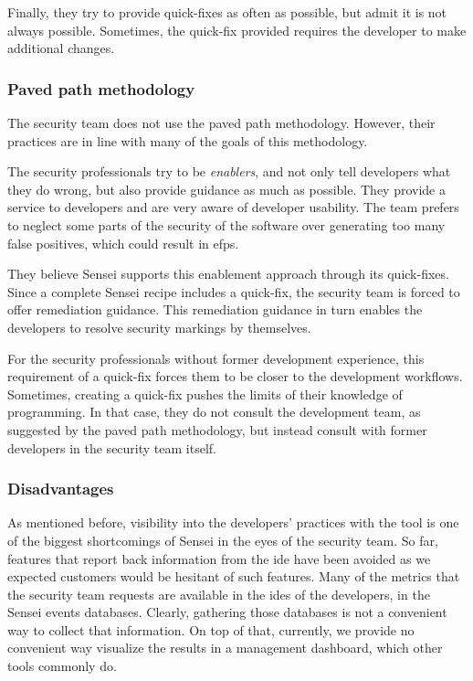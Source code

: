Finally, they try to provide quick-fixes as often as possible, but admit it is not always possible.
Sometimes, the quick-fix provided requires the developer to make additional changes.

\subsubsection{Paved path methodology}
The security team does not use the paved path methodology.
However, their practices are in line with many of the goals of this methodology.

The security professionals try to be \textit{enablers}, and not only tell developers what they do wrong, but also provide guidance as much as possible.
They provide a service to developers and are very aware of developer usability.
The team prefers to neglect some parts of the security of the software over generating too many false positives, which could result in \glspl{efp}.

They believe Sensei supports this enablement approach through its quick-fixes.
Since a complete Sensei recipe includes a quick-fix, the security team is forced to offer remediation guidance.
This remediation guidance in turn enables the developers to resolve security markings by themselves.

For the security professionals without former development experience, this requirement of a quick-fix forces them to be closer to the development workflows.
Sometimes, creating a quick-fix pushes the limits of their knowledge of programming.
In that case, they do not consult the development team, as suggested by the paved path methodology, but instead consult with former developers in the security team itself.

\subsubsection{Disadvantages}
As mentioned before, visibility into the developers' practices with the tool is one of the biggest shortcomings of Sensei in the eyes of the security team.
So far, features that report back information from the \gls{ide} have been avoided as we expected customers would be hesitant of such features.
Many of the metrics that the security team requests are available in the \glspl{ide} of the developers, in the Sensei events databases.
Clearly, gathering those databases is not a convenient way to collect that information.
On top of that, currently, we provide no convenient way visualize the results in a management dashboard, which other tools commonly do.

